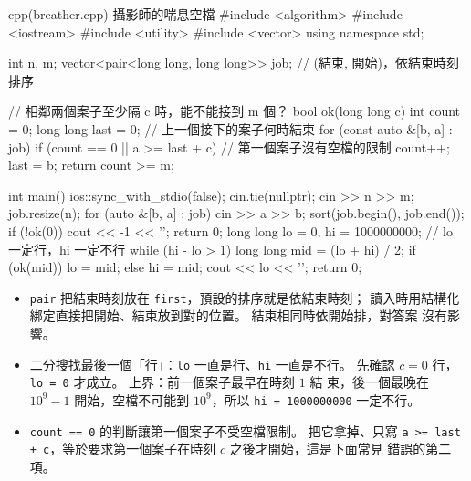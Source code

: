 \begin{example}[label=ex:cap-breather]{cpp}{(breather.cpp) 攝影師的喘息空檔}
#include <algorithm>
#include <iostream>
#include <utility>
#include <vector>
using namespace std;

int n, m;
vector<pair<long long, long long>> job;   // (結束, 開始)，依結束時刻排序

// 相鄰兩個案子至少隔 c 時，能不能接到 m 個？
bool ok(long long c) {
    int count = 0;
    long long last = 0;                    // 上一個接下的案子何時結束
    for (const auto &[b, a] : job) {
        if (count == 0 || a >= last + c) { // 第一個案子沒有空檔的限制
            count++;
            last = b;
        }
    }
    return count >= m;
}

int main() {
    ios::sync_with_stdio(false);
    cin.tie(nullptr);
    cin >> n >> m;
    job.resize(n);
    for (auto &[b, a] : job) {
        cin >> a >> b;
    }
    sort(job.begin(), job.end());
    if (!ok(0)) {
        cout << -1 << '\n';
        return 0;
    }
    long long lo = 0, hi = 1000000000;     // lo 一定行，hi 一定不行
    while (hi - lo > 1) {
        long long mid = (lo + hi) / 2;
        if (ok(mid)) {
            lo = mid;
        } else {
            hi = mid;
        }
    }
    cout << lo << '\n';
    return 0;
}
\end{example}


\begin{itemize}
\item \texttt{pair} 把結束時刻放在 \texttt{first}，預設的排序就是依結束時刻；
讀入時用結構化綁定直接把開始、結束放到對的位置。 結束相同時依開始排，對答案
沒有影響。
\item 二分搜找最後一個「行」：\texttt{lo} 一直是行、\texttt{hi} 一直是不行。
先確認 $c = 0$ 行，\texttt{lo = 0} 才成立。 上界：前一個案子最早在時刻 $1$ 結
束，後一個最晚在 $10^9 - 1$ 開始，空檔不可能到 $10^9$，所以 \texttt{hi =
1000000000} 一定不行。
\item \texttt{count == 0} 的判斷讓第一個案子不受空檔限制。 把它拿掉、只寫
\texttt{a >= last + c}，等於要求第一個案子在時刻 $c$ 之後才開始，這是下面常見
錯誤的第二項。
\end{itemize}


